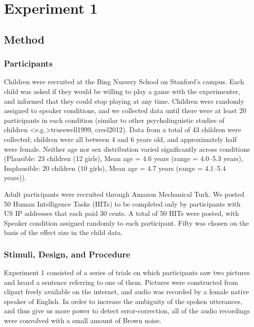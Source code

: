 \documentclass[man,floatsintext]{apa6}
\begin{document}
\section{Experiment 1}

\subsection{Method}
\subsubsection{Participants}

Children were recruited at the Bing Nursery School on Stanford's campus. Each child was asked if they would be willing to play a game with the experimenter, and informed that they could stop playing at any time. Children were randomly assigned to speaker conditions, and we collected data until there were at least 20 participants in each condition (similar to other psycholinguistic studies of children \citeNP<e.g.>{trueswell1999, creel2012}). Data from a total of 43 children were collected; children were all between 4 and 6 years old, and approximately half were female. Neither age nor sex distribution varied significantly across conditions (Plausible: 23 children (12 girls), Mean age = 4.6 years (range = 4.0--5.3 years), Implausible: 20 children (10 girls), Mean age = 4.7 years (range = 4.1--5.4 years)).

Adult participants were recruited through Amazon Mechanical Turk. We posted 50 Human Intelligence Tasks (HITs) to be completed only by participants with US IP addresses that each paid 30 cents. A total of 50 HITs were posted, with Speaker condition assigned randomly to each participant. Fifty was chosen on the basis of the effect size in the child data.

\subsubsection{Stimuli, Design, and Procedure}

Experiment 1 consisted of a series of trials on which participants saw two pictures and heard a sentence referring to one of them. Pictures were constructed from clipart freely available on the internet, and audio was recorded by a female native speaker of English. In order to increase the ambiguity of the spoken utterances, and thus give us more power to detect error-correction, all of the audio recordings were convolved with a small amount of Brown noise.
\end{document}
